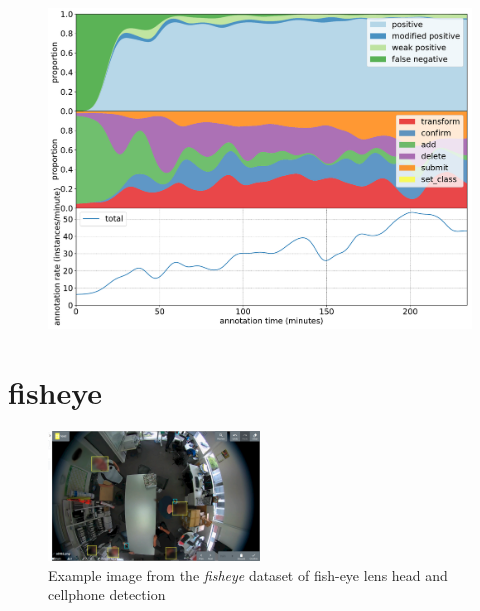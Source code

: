 \begin{figure}[!h]
\centering
\includegraphics[width=1.0\linewidth]{charts/action_annotations/buoys.pdf}
\caption{  }
\label{fig:buoys_annotation}
\end{figure}

\pagebreak
\section{fisheye}

\begin{figure}[H]
\begin{center}
  \includegraphics[width=0.5\textwidth]{figures/annotation/screenshots/victor.png}
\end{center}
  \caption{Example image from the \emph{fisheye} dataset of fish-eye lens head and cellphone detection }
\end{figure}

